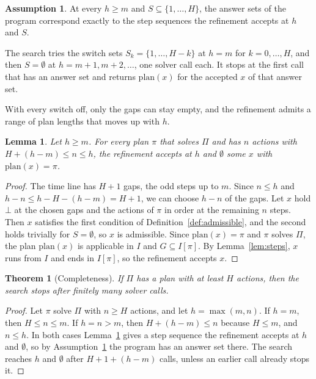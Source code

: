 \documentclass{article}
\theoremstyle{definition}
\theoremstyle{plain}
\newtheorem{lemma}{Lemma}
\newtheorem{theorem}{Theorem}
\theoremstyle{definition}
\newtheorem{assumption}{Assumption}
\begin{document}
\begin{assumption}\label{ass:encoding}
At every $h \geq m$ and $S \subseteq \{1,\dots,H\}$, the answer sets of the program correspond exactly to the step sequences the refinement accepts at $h$ and $S$.
\end{assumption}

The search tries the switch sets $S_k = \{1,\dots,H-k\}$ at $h = m$ for $k = 0,\dots,H$, and then $S = \emptyset$ at $h = m+1, m+2, \dots$, one solver call each. It stops at the first call that has an answer set and returns $\mathrm{plan}(x)$ for the accepted $x$ of that answer set.

With every switch off, only the gaps can stay empty, and the refinement admits a range of plan lengths that moves up with $h$.

\begin{lemma}\label{lem:lengths}
Let $h \geq m$. For every plan $\pi$ that solves $\Pi$ and has $n$ actions with $H + (h - m) \leq n \leq h$, the refinement accepts at $h$ and $\emptyset$ some $x$ with $\mathrm{plan}(x) = \pi$.
\end{lemma}

\begin{proof}
The time line has $H + 1$ gaps, the odd steps up to $m$. Since $n \leq h$ and $h - n \leq h - H - (h - m) = H + 1$, we can choose $h - n$ of the gaps. Let $x$ hold $\bot$ at the chosen gaps and the actions of $\pi$ in order at the remaining $n$ steps. Then $x$ satisfies the first condition of Definition~\ref{def:admissible}, and the second holds trivially for $S = \emptyset$, so $x$ is admissible. Since $\mathrm{plan}(x) = \pi$ and $\pi$ solves $\Pi$, the plan $\mathrm{plan}(x)$ is applicable in $I$ and $G \subseteq I[\pi]$. By Lemma~\ref{lem:steps}, $x$ runs from $I$ and ends in $I[\pi]$, so the refinement accepts $x$.
\end{proof}

\begin{theorem}[Completeness]\label{thm:complete}
If $\Pi$ has a plan with at least $H$ actions, then the search stops after finitely many solver calls.
\end{theorem}

\begin{proof}
Let $\pi$ solve $\Pi$ with $n \geq H$ actions, and let $h = \max(m, n)$. If $h = m$, then $H \leq n \leq m$. If $h = n > m$, then $H + (h - m) \leq n$ because $H \leq m$, and $n \leq h$. In both cases Lemma~\ref{lem:lengths} gives a step sequence the refinement accepts at $h$ and $\emptyset$, so by Assumption~\ref{ass:encoding} the program has an answer set there. The search reaches $h$ and $\emptyset$ after $H + 1 + (h - m)$ calls, unless an earlier call already stops it.
\end{proof}
\end{document}
